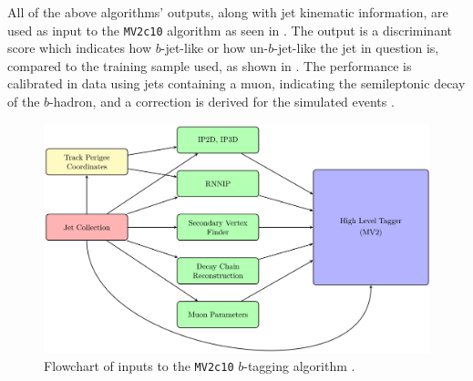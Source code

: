 All of the above algorithms' outputs, along with jet kinematic information, are
used as input to the \texttt{MV2c10} algorithm as seen in
.  The output is a discriminant score which
indicates how $b$-jet-like or how un-$b$-jet-like the jet in question is,
compared to the training sample used, as shown in
.  The performance is calibrated in data using
jets containing a muon, indicating the semileptonic decay of the $b$-hadron,
and a correction is derived for the simulated events \cite{Aaboud:2018xwy}.

\begin{figure}[!htbp]
  \centering
  \includegraphics[width=0.8\linewidth]{figures/objects/BDT_flowchart}
  \caption{Flowchart of inputs to the \texttt{MV2c10} $b$-tagging algorithm \cite{Feickert:2690521}.}
  \label{sec:objects:BDT_flowchart}
\end{figure}


